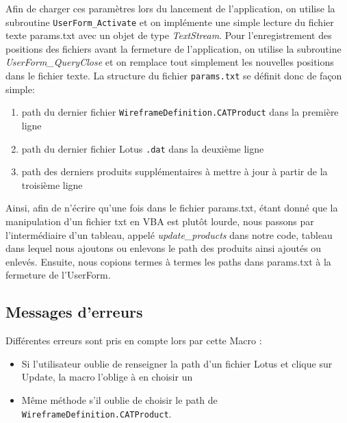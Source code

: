 \par Afin de charger ces paramètres lors du lancement de l'application, on utilise la subroutine \texttt{UserForm\_Activate} et on implémente une simple lecture du fichier texte params.txt avec un objet de type \textit{TextStream}. Pour l'enregistrement des positions des fichiers avant la fermeture de l'application, on utilise la subroutine \textit{UserForm\_QueryClose} et on remplace tout simplement les nouvelles positions dans le fichier texte. La structure du fichier \texttt{params.txt} se définit donc de façon simple:
\begin{enumerate}
    \item path du dernier fichier \texttt{WireframeDefinition.CATProduct} dans la première ligne
    \item path du dernier fichier Lotus \texttt{.dat} dans la deuxième ligne
    \item path des derniers produits supplémentaires à mettre à jour à partir de la troisième ligne
\end{enumerate}

\par Ainsi, afin de n'écrire qu'une fois dans le fichier params.txt, étant donné que la manipulation d'un fichier txt en VBA est plutôt lourde, nous passons par l'intermédiaire d'un tableau, appelé \textit{update\_products} dans notre code,  tableau dans lequel nous ajoutons ou enlevons le path des produits ainsi ajoutés ou enlevés. Ensuite, nous copions termes à termes les paths dans params.txt à la fermeture de l'UserForm.

\subsection{Messages d'erreurs} %

\par Différentes erreurs sont pris en compte lors par cette Macro :

\begin{itemize}
    \item Si l'utilisateur oublie de renseigner la path d'un fichier Lotus et clique sur Update, la macro l'oblige à en choisir un
    \item Même méthode s'il oublie de choisir le path de \texttt{WireframeDefinition.CATProduct}.
\end{itemize}
